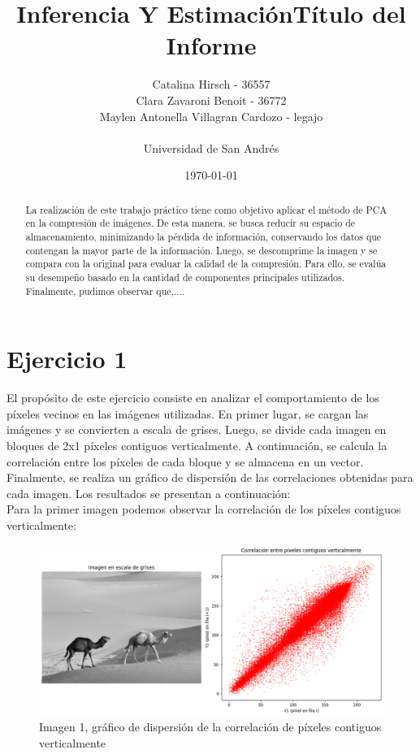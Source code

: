 \documentclass[a4paper,12pt]{article}
\title{Inferencia Y Estimación}
\title{Título del Informe}
\author{Catalina Hirsch - 36557 \\ Clara Zavaroni Benoit - 36772 \\ Maylen Antonella Villagran Cardozo - legajo \\ \\ Universidad de San Andrés}
\date{\today}
\begin{document}
\maketitle

\begin{abstract}
La realización de este trabajo práctico tiene como objetivo aplicar el método de 
PCA en la compresión de imágenes. De esta manera, se busca reducir su espacio de almacenamiento,
minimizando la pérdida de información, conservando los datos que contengan la mayor parte de la información.
Luego, se descomprime la imagen y se compara con la original para evaluar la calidad de la compresión. 
Para ello, se evalúa su desempeño basado en la cantidad de componentes principales utilizados.
Finalmente, pudimos observar que,....
\end{abstract}

\section{Ejercicio 1}
El propósito de este ejercicio consiste en analizar el comportamiento de los píxeles vecinos en las imágenes utilizadas.
En primer lugar, se cargan las imágenes y se convierten a escala de grises. Luego, se divide cada imagen en bloques de 2x1 píxeles
contiguos verticalmente. A continuación, se calcula la correlación entre los píxeles de cada bloque y se almacena en un vector.
Finalmente, se realiza un gráfico de dispersión de las correlaciones obtenidas para cada imagen.
Los resultados se presentan a continuación:
\\
Para la primer imagen podemos observar la correlación de los píxeles contiguos verticalmente:

\begin{figure}[H]
    \centering
    \includegraphics[width=1\textwidth]{Ejercicio1a.png}
    \caption{Imagen 1, gráfico de dispersión de la correlación de píxeles contiguos verticalmente}
    \label{fig:correlacion1}
\end{figure}
\end{document}
